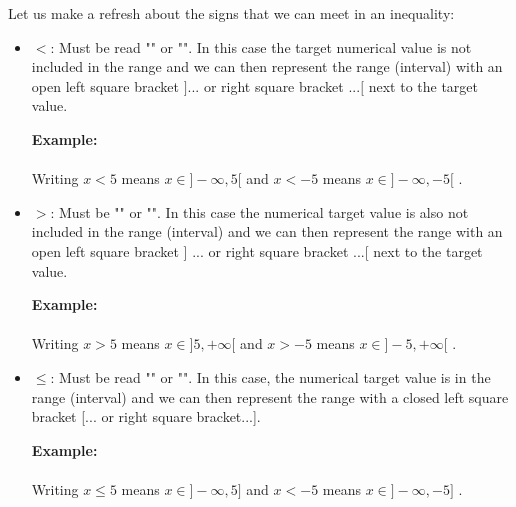 	Let us make a refresh about the signs that we can meet in an inequality:
	\begin{itemize}
		\item $<$: Must be read "" or "". In this case the target numerical value is not included in the range and we can then represent the range (interval) with an open left square bracket $] ...$ or right square bracket $... [$ next to the target value.
		
		\begin{tcolorbox}[colframe=black,colback=white,sharp corners]
		\textbf{{\Large {}}Example:}\\\\
		Writing $x<5$ means $x \in ]-\infty,5[$ and $x<-5$ means $x \in ]-\infty,-5[$ .
		\end{tcolorbox}
		
		\item $>$: Must be "" or "". In this case the numerical target value is also not included in the range (interval) and we can then represent the range with an open left square bracket ] ... or right square bracket ...[  next to the target value.
		
		\begin{tcolorbox}[colframe=black,colback=white,sharp corners]
	\textbf{{\Large {}}Example:}\\\\
		Writing $x>5$ means $x \in ]5,+\infty[$ and $x>-5$ means $x \in ]-5,+\infty[$ .
		\end{tcolorbox}
		
		\item $\leq$: Must be read "" or "". In this case, the numerical target value is in the range (interval) and we can then represent the range  with a closed left square bracket [... or right square bracket...].
		
		\begin{tcolorbox}[colframe=black,colback=white,sharp corners]
	\textbf{{\Large {}}Example:}\\\\
		Writing $x\leq 5$ means $x \in ]-\infty,5]$ and $x<-5$ means $x \in ]-\infty,-5]$ .
		\end{tcolorbox}
		

\end{itemize}
